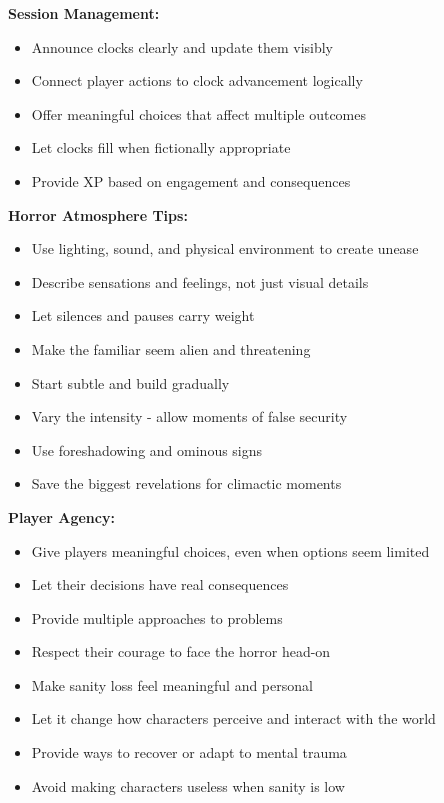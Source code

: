 \documentclass[11pt]{article}
\begin{document}
\textbf{Session Management:}
\begin{itemize}
    \item Announce clocks clearly and update them visibly
    \item Connect player actions to clock advancement logically
    \item Offer meaningful choices that affect multiple outcomes
    \item Let clocks fill when fictionally appropriate
    \item Provide XP based on engagement and consequences
\end{itemize}

\textbf{Horror Atmosphere Tips:}
\begin{itemize}
    \item Use lighting, sound, and physical environment to create unease
    \item Describe sensations and feelings, not just visual details
    \item Let silences and pauses carry weight
    \item Make the familiar seem alien and threatening
    \item Start subtle and build gradually
    \item Vary the intensity - allow moments of false security
    \item Use foreshadowing and ominous signs
    \item Save the biggest revelations for climactic moments
\end{itemize}

\textbf{Player Agency:}
\begin{itemize}
    \item Give players meaningful choices, even when options seem limited
    \item Let their decisions have real consequences
    \item Provide multiple approaches to problems
    \item Respect their courage to face the horror head-on
    \item Make sanity loss feel meaningful and personal
    \item Let it change how characters perceive and interact with the world
    \item Provide ways to recover or adapt to mental trauma
    \item Avoid making characters useless when sanity is low
\end{itemize}
\end{document}
